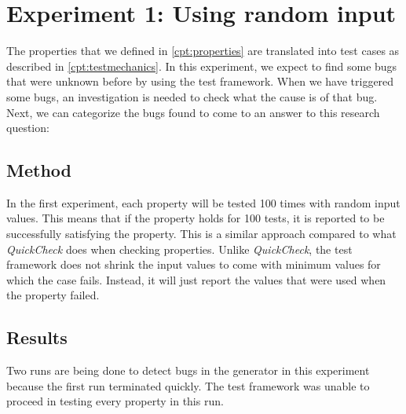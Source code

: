 \chapter{Experiment 1: Using random input}
\label{cpt:experiment1}
The properties that we defined in \autoref{cpt:properties} are translated into
test cases as described in \autoref{cpt:testmechanics}. In this experiment, we
expect to find some bugs that were unknown before by using the test framework.
When we have triggered some bugs, an investigation is needed to check what the
cause is of that bug. Next, we can categorize the bugs found to come to an
answer to this research question:\rqThree{}

\section{Method}
In the first experiment, each property will be tested 100 times with random
input values. This means that if the property holds for 100 tests, it is
reported to be successfully satisfying the property. This is a similar approach
compared to what \textit{QuickCheck} does when checking properties. Unlike
\textit{QuickCheck}, the test framework does not shrink the input values to come
with minimum values for which the case fails. Instead, it will just report the
values that were used when the property failed.

\section{Results}
Two runs are being done to detect bugs in the generator in this experiment
because the first run terminated quickly. The test framework was unable to
proceed in testing every property in this run.

